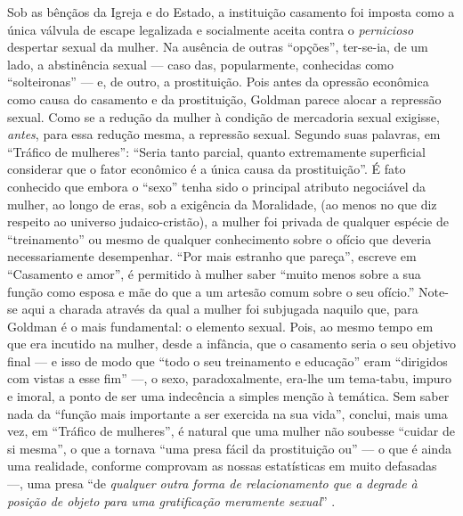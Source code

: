 Sob as bênçãos da Igreja e do Estado, a instituição casamento foi
imposta como a única válvula de escape legalizada e socialmente aceita
contra o \emph{pernicioso} despertar sexual da mulher. Na ausência de
outras ``opções'', ter-se-ia, de um lado, a abstinência sexual --- caso
das, popularmente, conhecidas como ``solteironas'' --- e, de outro, a
prostituição. Pois antes da opressão econômica como causa do casamento e
da prostituição, Goldman parece alocar a repressão sexual. Como se a
redução da mulher à condição de mercadoria sexual exigisse,
\emph{antes}, para essa redução mesma, a repressão sexual. Segundo suas
palavras, em ``Tráfico de mulheres'': ``Seria tanto parcial, quanto
extremamente superficial considerar que o fator econômico é a única
causa da prostituição''. É fato conhecido que embora o ``sexo'' tenha
sido o principal atributo negociável da mulher, ao longo de eras, sob a
exigência da Moralidade, (ao menos no que diz respeito ao universo
judaico-cristão), a mulher foi privada de qualquer espécie de
``treinamento'' ou mesmo de qualquer conhecimento sobre o ofício que
deveria necessariamente desempenhar. ``Por mais estranho que pareça'',
escreve em ``Casamento e amor'', é permitido à mulher saber ``muito
menos sobre a sua função como esposa e mãe do que a um artesão comum
sobre o seu ofício.'' Note-se aqui a charada através da qual a mulher
foi subjugada naquilo que, para Goldman é o mais fundamental: o elemento
sexual. Pois, ao mesmo tempo em que era incutido na mulher, desde a
infância, que o casamento seria o seu objetivo final --- e isso de modo
que ``todo o seu treinamento e educação'' eram ``dirigidos com vistas a
esse fim'' ---, o sexo, paradoxalmente, era-lhe um tema-tabu, impuro e
imoral, a ponto de ser uma indecência a simples menção à temática. Sem
saber nada da ``função mais importante a ser exercida na sua vida'',
conclui, mais uma vez, em ``Tráfico de mulheres'', é natural que uma
mulher não soubesse ``cuidar de si mesma'', o que a tornava ``uma presa
fácil da prostituição ou'' --- o que é ainda uma realidade, conforme
comprovam as nossas estatísticas em muito defasadas ---, uma presa ``de
\emph{qualquer outra forma de relacionamento que a degrade à posição de
objeto para uma gratificação meramente sexual}'' .

